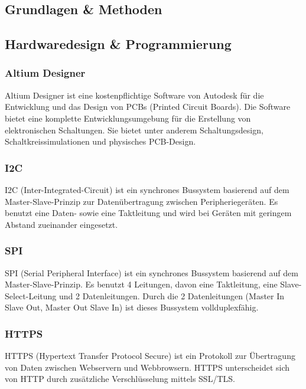 \begin{inhalt}
\chapter{Grundlagen \& Methoden}
\renewcommand*\chapterpagestyle{scrheadings}
 \section{Hardwaredesign \& Programmierung}
 
\subsection{Altium Designer}

Altium Designer ist eine kostenpflichtige Software von Autodesk für die Entwicklung und das Design von PCBs (Printed Circuit Boards). Die Software bietet eine komplette Entwicklungsumgebung für die Erstellung von elektronischen Schaltungen. Sie bietet unter anderem Schaltungsdesign, Schaltkreissimulationen und physisches PCB-Design. 
 \cite{AltiumDesignerWiki}

\subsection{I2C}

I2C (Inter-Integrated-Circuit) ist ein synchrones Bussystem basierend auf dem Master-Slave-Prinzip zur Datenübertragung zwischen Peripheriegeräten. Es benutzt eine Daten- sowie eine Taktleitung und wird bei Geräten mit geringem Abstand zueinander eingesetzt. 
 \cite{I2CKommunikation}

\subsection{SPI}

SPI (Serial Peripheral Interface) ist ein synchrones Bussystem basierend auf dem Master-Slave-Prinzip. Es benutzt 4 Leitungen, davon eine Taktleitung, eine Slave-Select-Leitung und 2 Datenleitungen. Durch die 2 Datenleitungen (Master In Slave Out, Master Out Slave In) ist dieses Bussystem vollduplexfähig. \cite{SPI_Kommunikation}

\subsection{HTTPS} \label{sec:HTTPS-Grundlagen}

HTTPS (Hypertext Transfer Protocol Secure) ist ein Protokoll zur Übertragung von Daten zwischen Webservern und Webbrowsern. HTTPS unterscheidet sich von HTTP durch zusätzliche Verschlüsselung mittels SSL/TLS. \cite{HTTPS_Kommunikation}


\end{inhalt}
